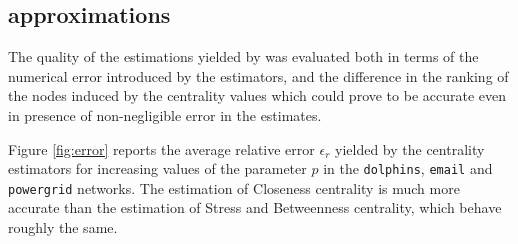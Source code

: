 %
%
%
%



















\subsection{\multibfs{} approximations}
The quality of the estimations yielded by \multibfs{} was evaluated both in terms of the numerical error introduced by the estimators, and the difference in the ranking of the nodes induced by the centrality values which could prove to be accurate even in presence of non-negligible error in the estimates.

Figure \ref{fig:error} reports the average relative error $\epsilon_r$ yielded by the centrality estimators for increasing values of the parameter $p$ in the \texttt{dolphins}, \texttt{email} and \texttt{powergrid} networks. The estimation of Closeness centrality is much more accurate than the estimation of Stress and Betweenness centrality, which behave roughly the same.

